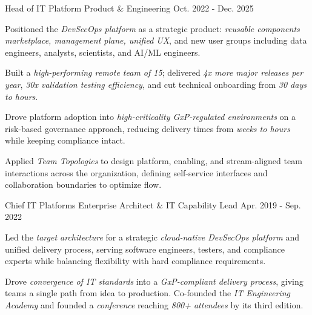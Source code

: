 \begin{cventries}
    \vspace{-4.0mm}
    \newpage

  \cventry
    {Head of IT Platform Product \& Engineering} %
    {} %
    {} %
    {Oct. 2022 - Dec. 2025} %
    {
      \begin{cvitems}
        \item {Positioned the \textit{DevSecOps platform} as a strategic product: \textit{reusable components marketplace, management plane, unified UX}, and new user groups including data engineers, analysts, scientists, and AI/ML engineers.}
        \item {Built a \textit{high-performing remote team of 15}; delivered \textit{4x more major releases per year}, \textit{30x validation testing efficiency}, and cut technical onboarding from \textit{30 days to hours}.}
        \item {Drove platform adoption into \textit{high-criticality GxP-regulated environments} on a risk-based governance approach, reducing delivery times from \textit{weeks to hours} while keeping compliance intact.}
        \item {Applied \textit{Team Topologies} to design platform, enabling, and stream-aligned team interactions across the organization, defining self-service interfaces and collaboration boundaries to optimize flow.}
      \end{cvitems}
    }

  \cventry
    {Chief IT Platforms Enterprise Architect \& IT Capability Lead} %
    {} %
    {} %
    {Apr. 2019 - Sep. 2022} %
    {
      \begin{cvitems}
        \item {Led the \textit{target architecture} for a strategic \textit{cloud-native DevSecOps platform} and unified delivery process, serving software engineers, testers, and compliance experts while balancing flexibility with hard compliance requirements.}
        \item {Drove \textit{convergence of IT standards} into a \textit{GxP-compliant delivery process}, giving teams a single path from idea to production. Co-founded the \textit{IT Engineering Academy} and founded a \textit{conference} reaching \textit{800+ attendees} by its third edition.}
      \end{cvitems}
    }


\end{cventries}
